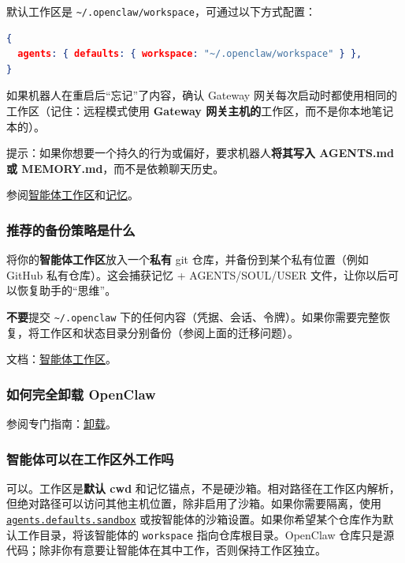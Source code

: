 默认工作区是 \texttt{\textasciitilde{}/.openclaw/workspace}，可通过以下方式配置：

\begin{lstlisting}[language=json]
{
  agents: { defaults: { workspace: "~/.openclaw/workspace" } },
}
\end{lstlisting}


如果机器人在重启后“忘记”了内容，确认 Gateway 网关每次启动时都使用相同的工作区（记住：远程模式使用 \textbf{Gateway 网关主机的}工作区，而不是你本地笔记本的）。

提示：如果你想要一个持久的行为或偏好，要求机器人\textbf{将其写入 AGENTS.md 或 MEMORY.md}，而不是依赖聊天历史。

参阅\href{/concepts/agent-workspace}{智能体工作区}和\href{/concepts/memory}{记忆}。

\subsubsection{推荐的备份策略是什么}


将你的\textbf{智能体工作区}放入一个\textbf{私有} git 仓库，并备份到某个私有位置（例如 GitHub 私有仓库）。这会捕获记忆 + AGENTS/SOUL/USER 文件，让你以后可以恢复助手的“思维”。

\textbf{不要}提交 \texttt{\textasciitilde{}/.openclaw} 下的任何内容（凭据、会话、令牌）。如果你需要完整恢复，将工作区和状态目录分别备份（参阅上面的迁移问题）。

文档：\href{/concepts/agent-workspace}{智能体工作区}。

\subsubsection{如何完全卸载 OpenClaw}


参阅专门指南：\href{/install/uninstall}{卸载}。

\subsubsection{智能体可以在工作区外工作吗}


可以。工作区是\textbf{默认 cwd} 和记忆锚点，不是硬沙箱。相对路径在工作区内解析，但绝对路径可以访问其他主机位置，除非启用了沙箱。如果你需要隔离，使用 \href{/gateway/sandboxing}{\texttt{agents.defaults.sandbox}} 或按智能体的沙箱设置。如果你希望某个仓库作为默认工作目录，将该智能体的 \texttt{workspace} 指向仓库根目录。OpenClaw 仓库只是源代码；除非你有意要让智能体在其中工作，否则保持工作区独立。

